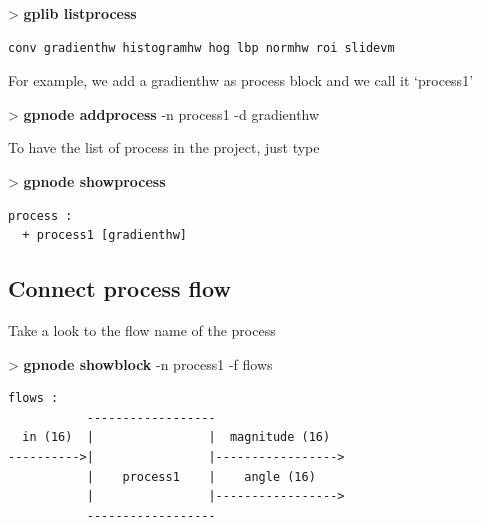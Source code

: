 \documentclass[10pt,a4paper]{article}
\begin{document}
\begin{sample}
> \textbf{gplib listprocess}
\begin{Verbatim}
conv gradienthw histogramhw hog lbp normhw roi slidevm
\end{Verbatim}
\end{sample}

For example, we add a gradienthw as process block and we call it `process1'

\begin{sample}
> \textbf{gpnode addprocess} -n process1 -d gradienthw
\end{sample}

To have the list of process in the project, just type

\begin{sample}
> \textbf{gpnode showprocess}
\begin{Verbatim}
process :
  + process1 [gradienthw]
\end{Verbatim}
\end{sample}
  

\subsection{Connect process flow}

Take a look to the flow name of the process

\begin{sample}
> \textbf{gpnode showblock} -n process1 -f flows
\begin{Verbatim}
flows :
           ------------------
  in (16)  |                |  magnitude (16)
---------->|                |----------------->
           |    process1    |    angle (16)
           |                |----------------->
           ------------------
\end{Verbatim}
\end{sample}
\end{document}
